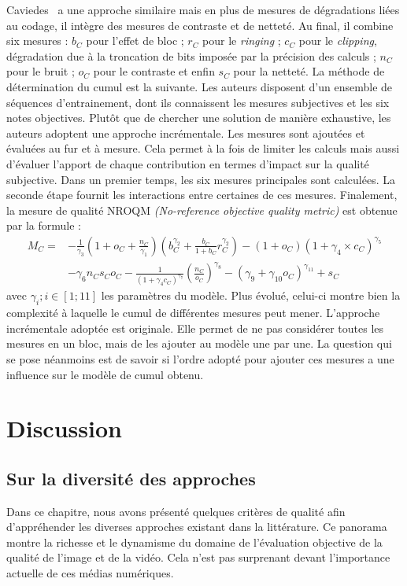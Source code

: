 Caviedes~\cite{caviedes-nrqm} a une approche similaire mais en plus de mesures de dégradations liées au codage, il intègre des mesures de contraste et de netteté. Au final, il combine six mesures : $b_C$ pour l'effet de bloc ; $r_C$ pour le \emph{ringing} ; $c_C$ pour le \emph{clipping}, dégradation due à la troncation de bits imposée par la précision des calculs ; $n_C$ pour le bruit ; $o_C$ pour le contraste et enfin $s_C$ pour la netteté. La méthode de détermination du cumul est la suivante. Les auteurs disposent d'un ensemble de séquences d'entrainement, dont ils connaissent les mesures subjectives et les six notes objectives. Plutôt que de chercher une solution de manière exhaustive, les auteurs adoptent une approche incrémentale. Les mesures sont ajoutées et évaluées au fur et à mesure. Cela permet à la fois de limiter les calculs mais aussi d'évaluer l'apport de chaque contribution en termes d'impact sur la qualité subjective. Dans un premier temps, les six mesures principales sont calculées. La seconde étape fournit les interactions entre certaines de ces mesures. Finalement, la mesure de qualité NROQM \emph{(No-reference objective quality metric)} est obtenue par la formule :
\begin{equation}
\begin{array}{rl}
M_C =	& - \frac{1}{\gamma_3}\left(1+o_C + \frac{n_C}{\gamma_1}\right)\left( b_C^{\gamma_2} + \frac{b_C}{1+b_C}r_C^{\gamma_2} \right) - (1+ o_C)(1+\gamma_4\times c_C)^{\gamma_5}\\
			& - \gamma_6n_Cs_Co_C - \frac{1}{\left( 1+\gamma_4c_C\right)^{\gamma_7}}\left( \frac{n_C}{o_C}\right)^{\gamma_8} - \left( \gamma_9+\gamma_{10}o_C\right)^{\gamma_{11}} + s_C
\end{array}
\end{equation}
%
avec $\gamma_i ; i \in [1 ; 11]$ les paramètres du modèle. Plus évolué, celui-ci montre bien la complexité à laquelle le cumul de différentes mesures peut mener. L'approche incrémentale adoptée est originale. Elle permet de ne pas considérer toutes les mesures en un bloc, mais de les ajouter au modèle une par une. La question qui se pose néanmoins est de savoir si l'ordre adopté pour ajouter ces mesures a une influence sur le modèle de cumul obtenu.


\section{Discussion}
\subsection{Sur la diversité des approches}
Dans ce chapitre, nous avons présenté quelques critères de qualité afin d'appréhender les diverses approches existant dans la littérature. Ce panorama montre la richesse et le dynamisme du domaine de l'évaluation objective de la qualité de l'image et de la vidéo. Cela n'est pas surprenant devant l'importance actuelle de ces médias numériques.

